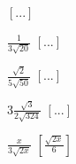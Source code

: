\begin{esercizio}[*]
\begin{htmulticols}{4}
\begin{enumeratea}
\hfill \(\left[...\right]\)
\item \(\frac 1{3\sqrt{20}}\)
\hfill \(\left[...\right]\)
\item \(\frac{\sqrt 2}{5\sqrt{50}}\)
\hfill \(\left[...\right]\)
\item \(3\frac{\sqrt 3}{2\sqrt{324}}\)
\hfill \(\left[...\right]\)
\item \(\frac x{3\sqrt{2x}}\)
\hfill \(\left[\frac{\sqrt{2x}} 6\right]\)
\end{enumeratea}
\end{htmulticols}
\end{esercizio}



